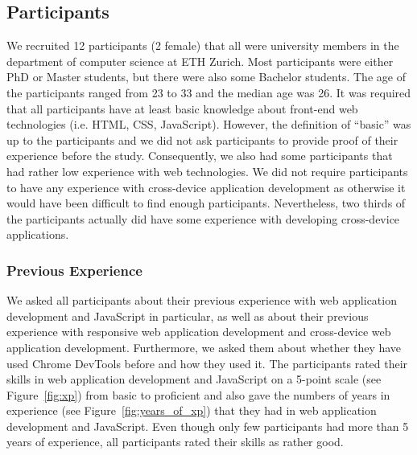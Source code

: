 \subsection{Participants}

We recruited 12 participants (2 female) that all were university members in the department of computer science at ETH Zurich. Most participants were either PhD or Master students, but there were also some Bachelor students. The age of the participants ranged from 23 to 33 and the median age was 26. It was required that all participants have at least basic knowledge about front-end web technologies (i.e. HTML, CSS, JavaScript). However, the definition of ``basic'' was up to the participants and we did not ask participants to provide proof of their experience before the study. Consequently, we also had some participants that had rather low experience with web technologies. We did not require participants to have any experience with cross-device application development as otherwise it would have been difficult to find enough participants. Nevertheless, two thirds of the participants actually did have some experience with developing cross-device applications.

\subsubsection{Previous Experience}
We asked all participants about their previous experience with web application development and JavaScript in particular, as well as about their previous experience with responsive web application development and cross-device web application development. Furthermore, we asked them about whether they have used Chrome DevTools before and how they used it. The participants rated their skills in web application development and JavaScript on a 5-point scale (see Figure~\ref{fig:xp}) from basic to proficient and also gave the numbers of years in experience (see Figure~\ref{fig:years_of_xp}) that they had in web application development and JavaScript. Even though only few participants had more than 5 years of experience, all participants rated their skills as rather good.


